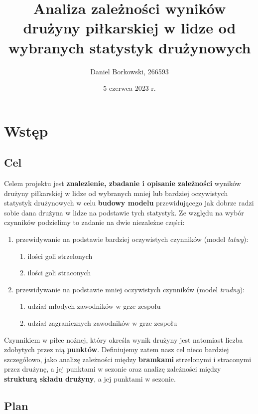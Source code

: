 \documentclass{article}
\title{Analiza zależności wyników drużyny piłkarskiej w lidze od wybranych statystyk drużynowych}
\author{Daniel Borkowski, 266593}
\date{5 czerwca 2023 r.}
\begin{document}
\maketitle
\tableofcontents

\section{Wstęp}

\subsection{Cel}
Celem projektu jest \textbf{znalezienie, zbadanie i opisanie zależności} wyników drużyny piłkarskiej w lidze od wybranych mniej lub bardziej oczywistych statystyk drużynowych w celu \textbf{budowy modelu} przewidującego jak dobrze radzi sobie dana drużyna w lidze na podstawie tych statystyk. Ze względu na wybór czynników podzielimy to zadanie na dwie niezależne części:
\begin{enumerate}
    \item przewidywanie na podstawie bardziej oczywistych czynników (model \textit{łatwy}):
    \begin{enumerate}
        \item ilości goli strzelonych
        \item ilości goli straconych
    \end{enumerate}
    \item przewidywanie na podstawie mniej oczywistych czynników (model \textit{trudny}):
    \begin{enumerate}
        \item udział młodych zawodników w grze zespołu
        \item udział zagranicznych zawodników w grze zespołu
    \end{enumerate}
\end{enumerate}

Czynnikiem w piłce nożnej, który określa wynik drużyny jest natomiast liczba zdobytych przez nią \textbf{punktów}.
Definiujemy zatem nasz cel nieco bardziej szczegółowo, jako analizę zależności między \textbf{bramkami} strzelonymi i straconymi przez drużynę, a jej punktami w sezonie oraz analizę zależności między \textbf{strukturą składu drużyny}, a jej punktami w sezonie.

\subsection{Plan}
\end{document}
